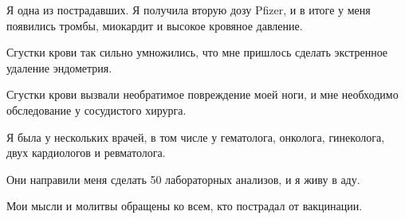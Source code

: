 Я одна из пострадавших. Я получила вторую дозу Pfizer, и в итоге у меня
появились тромбы, миокардит и высокое кровяное давление.

Сгустки крови так сильно умножились, что мне пришлось сделать экстренное
удаление эндометрия.

Сгустки крови вызвали необратимое повреждение моей ноги, и мне необходимо
обследование у сосудистого хирурга.

Я была у нескольких врачей, в том числе у гематолога, онколога, гинеколога, двух
кардиологов и ревматолога.

Они направили меня сделать 50 лабораторных анализов, и я живу в аду.

Мои мысли и молитвы обращены ко всем, кто пострадал от вакцинации.
